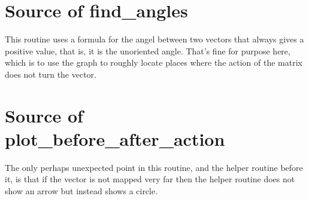 \section{Source of find\_angles}
This routine uses a formula for the angel between two vectors that 
always gives a positive value, that is, it is the unoriented angle.
That's fine for purpose here, which is to use the graph to 
roughly locate places where the action of the matrix does not turn the
vector. 



\section{Source of plot\_before\_after\_action}
The only perhaps unexpected point in this routine, and the helper routine
before it, is that if the vector is not mapped very far then the helper
routine does not show an arrow but instead shows a circle.



\endinput

TODO

1) Does python intro show 
   > x, y = 5, 7
construct?